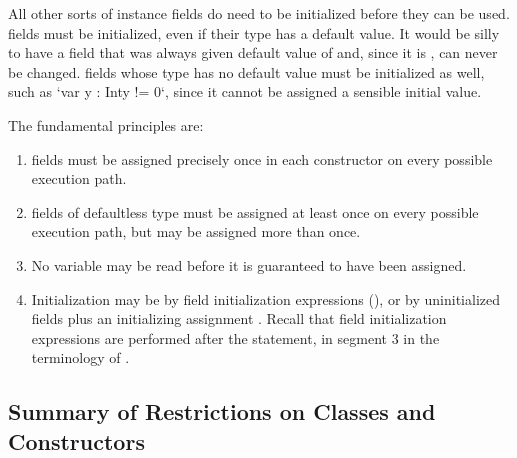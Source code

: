 All other sorts of instance fields do need to be initialized before they can
be used.   fields must be initialized, even if their type has a
default value.  It would be silly to have a field  that was
always given default value of  and, since it is , can never be
changed.   fields whose type has no default value must be initialized
as well, such as \xcd`var y : Int{y != 0}`, since it cannot be assigned a
sensible initial value. 

The fundamental principles are: 
\begin{enumerate}
\item {} fields must be assigned precisely once in each constructor on every
possible execution path.  
\item {} fields of defaultless type must be
assigned at least once on every possible execution path, but may be assigned
more than once.  
\item No variable may be read before it is guaranteed to have been
assigned.  
\item Initialization may be by field initialization expressions (), or by uninitialized fields  plus
an initializing assignment .  Recall that field initialization
expressions are performed after the  statement, in segment 3 in
the terminology of .  
\end{enumerate}



\subsection{Summary of Restrictions on Classes and Constructors}

